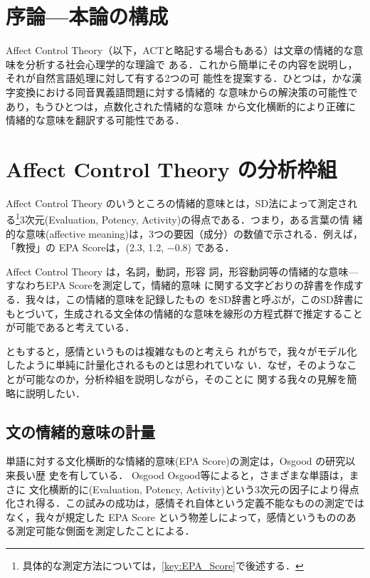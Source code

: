 \documentclass[japanese]{jnlp_1.3d}
\newcommand{\citep}{}
\begin{document}
\maketitle





\section*{序論—本論の構成}
Affect Control Theory（以下，ACTと略記する場合もある）は文章の情緒的な意味を分析する社会心理学的な理論で
ある．これから簡単にその内容を説明し，それが自然言語処理に対して有する2つの可
能性を提案する．ひとつは，かな漢字変換における同音異義語問題に対する情緒的
な意味からの解決策の可能性であり，もうひとつは，点数化された情緒的な意味
から文化横断的により正確に情緒的な意味を翻訳する可能性である．


\section{Affect Control Theory の分析枠組}
Affect Control Theory のいうところの情緒的意味とは，SD法によって測定され
る\footnote{具体的な測定方法については，\ref{key:EPA_Score}で後述する．}3次元(Evaluation, Potency, Activity)の得点である．つまり，ある言葉の情
緒的な意味(affective meaning)は，3つの要因（成分）の数値で示される．例えば，
「教授」の EPA Scoreは，(2.3, 1.2, $-0.8$) である．

Affect Control Theory は，名詞，動詞，形容
詞，形容動詞等の情緒的な意味—すなわちEPA Scoreを測定して，情緒的意味
に関する文字どおりの辞書を作成する．我々は，この情緒的意味を記録したもの
をSD辞書と呼ぶが，このSD辞書にもとづいて，生成される文全体の情緒的な意味を線形の方程式群で推定することが可能であると考えている．

ともすると，感情というものは複雑なものと考えら
れがちで，我々がモデル化したように単純に計量化されるものとは思われていな
い．なぜ，そのようなことが可能なのか，分析枠組を説明しながら，そのことに
関する我々の見解を簡略に説明したい．


\subsection{文の情緒的意味の計量}
単語に対する文化横断的な情緒的意味(EPA Score)の測定は，Osgood の研究以来長い歴
史を有している．
Osgood \citep{Osgood}等によると，さまざまな単語は，まさに
文化横断的に(Evaluation, Potency, Activity)という3次元の因子により得点化され得る．この試みの成功は，感情それ自体という定義不能なものの測定ではなく，我々が規定した EPA Score という物差しによって，感情というもののある測定可能な側面を測定したことによる． 
\end{document}
